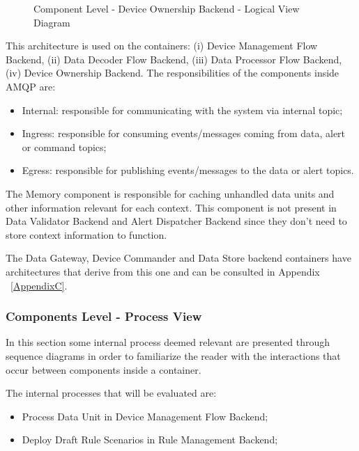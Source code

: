 \begin{figure}[H]
   \centering
   \resizebox{\columnwidth}{!}
   {
      
   }
   \caption[Component Level - Device Ownership Backend - Logical View Diagram]{Component Level - Device Ownership Backend - Logical View Diagram}
   \label{fig:design:architecture:component:logical:diagram:ownership}
\end{figure}

This architecture is used on the containers: (i) Device Management Flow Backend, (ii) Data Decoder Flow Backend, (iii) Data Processor Flow Backend, (iv) Device Ownership Backend. The responsibilities of the components inside AMQP are:

\begin{itemize}
   \item Internal: responsible for communicating with the system via internal topic; 
   \item Ingress: responsible for consuming events/messages coming from data, alert or command topics;
   \item Egress: responsible for publishing events/messages to the data or alert topics.
\end{itemize}

The Memory component is responsible for caching unhandled data units and other information relevant for each context. This component is not present in Data Validator Backend and Alert Dispatcher Backend since they don't need to store context information to function.

The Data Gateway, Device Commander and Data Store backend containers have architectures that derive from this one and can be consulted in Appendix ~\ref{AppendixC}.

\subsubsection{Components Level - Process View}
\label{subsubsec:design:architecture:components:process}

In this section some internal process deemed relevant are presented through sequence diagrams in order to familiarize the reader with the interactions that occur between components inside a container.

The internal processes that will be evaluated are:

\begin{itemize}
   \item Process Data Unit in Device Management Flow Backend;
   \item Deploy Draft Rule Scenarios in Rule Management Backend;
\end{itemize}

